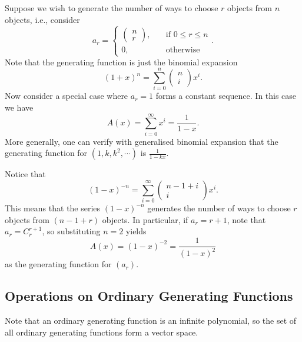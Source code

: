 \documentclass[math]{amznotes}
\theoremstyle{remark}
\begin{document}
Suppose we wish to generate the number of ways to choose $r$ objects from $n$ objects, i.e., consider
\begin{equation*}
    a_r = \begin{cases}
        \begin{pmatrix}
            n \\
            r
        \end{pmatrix}, & \quad\textrm{if } 0 \leq r \leq n \\
        0, & \quad\textrm{otherwise}
    \end{cases}.
\end{equation*}
Note that the generating function is just the binomial expansion
\begin{equation*}
    (1 + x)^n = \sum_{i = 0}^{n}\begin{pmatrix}
        n \\
        i
    \end{pmatrix}x^i.
\end{equation*}
Now consider a special case where $a_r = 1$ forms a constant sequence. In this case we have
\begin{equation*}
    A(x) = \sum_{i = 0}^{\infty}x^i = \frac{1}{1 - x}.
\end{equation*}
More generally, one can verify with generalised binomial expansion that the generating function for $\left(1, k, k^2, \cdots\right)$ is $\frac{1}{1 - kx}$.

Notice that
\begin{equation*}
    (1 - x)^{-n} = \sum_{i = 0}^{\infty}\begin{pmatrix}
        n - 1 + i \\
        i
    \end{pmatrix}x^i.
\end{equation*}
This means that the series $(1 - x)^{-n}$ generates the number of ways to choose $r$ objects from $(n - 1 + r)$ objects. In particular, if $a_r = r + 1$, note that $a_r = C^{r + 1}_r$, so substituting $n = 2$ yields
\begin{equation*}
    A(x) = (1 - x)^{-2} = \frac{1}{(1 - x)^2}
\end{equation*}
as the generating function for $(a_r)$.
\subsection{Operations on Ordinary Generating Functions}
Note that an ordinary generating function is an infinite polynomial, so the set of all ordinary generating functions form a vector space. 
\end{document}
